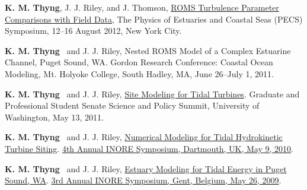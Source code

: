 \documentclass[10pt,letterpaper]{article}
\newcommand{\kmt}{\textbf{K. M. Thyng}}
\renewenvironment{itemize}{
  \begin{list}{}{
    \setlength{\leftmargin}{1.5em}
    \setlength{\itemsep}{0.25em}
    \setlength{\parskip}{0pt}
    \setlength{\parsep}{0.25em}
  }
}{
  \end{list}
}
\begin{document}
\begin{itemize}
\item \kmt, J. J. Riley, and J. Thomson, \href{http://pong.tamu.edu/~kthyng/posters/pecs.pdf}{ROMS Turbulence Parameter Comparisons with Field Data}, The Physics of Estuaries and Coastal Seas (PECS) Symposium, 12--16 August 2012, New York City.

\item \kmt~ and J. J. Riley, Nested ROMS Model of a Complex Estuarine Channel, Puget Sound, WA. Gordon Research Conference: Coastal Ocean Modeling,
  Mt. Holyoke College, South Hadley,  MA,
  June 26--July 1, 2011.

\item \kmt~ and J. J. Riley, \href{http://froude.me.washington.edu/presentations/GPSS051311.pdf}{Site Modeling for Tidal Turbines}. Graduate and Professional Student Senate Science and Policy Summit, University of Washington, May 13, 2011.

\item \kmt~ and J. J. Riley, \href{http://froude.me.washington.edu/presentations/InorePoster2010/inore.pdf}{Numerical Modeling for Tidal
Hydrokinetic Turbine Siting}. \href{http://www.inore.org}{4th Annual INORE Symposium, Dartmouth, UK, May 9, 2010}.

\item \kmt~ and J. J. Riley, \href{http://froude.me.washington.edu/presentations/inore_poster2009.pdf}{Estuary Modeling for Tidal Energy in Puget Sound, WA}. \href{http://www.inore.org}{3rd Annual INORE Symposium, Gent, Belgium, May 26, 2009}.

\end{itemize}
\end{document}
